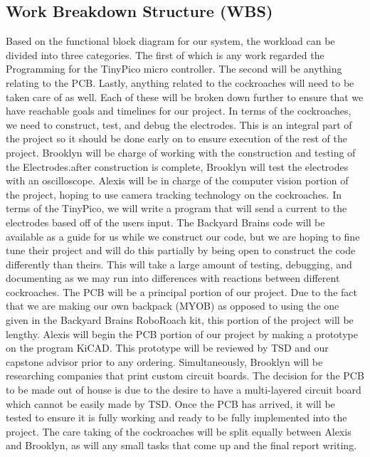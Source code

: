 \documentclass[twocolumn,10pt]{IEEEtran}
\begin{document}
\subsection{Work Breakdown Structure (WBS)}
Based on the functional block diagram for our system, the workload can be divided into three categories. The first of which is any work regarded the Programming for the TinyPico micro controller. The second will be anything relating to the PCB. Lastly, anything related to the cockroaches will need to be taken care of as well. Each of these will be broken down further to ensure that we have reachable goals and timelines for our project. In terms of the cockroaches, we need to construct, test, and debug the electrodes. This is an integral part of the project so it should be done early on to ensure execution of the rest of the project. Brooklyn will be charge of working with the construction and testing of the Electrodes.after construction is complete, Brooklyn will test the electrodes with an oscilloscope. Alexis will be in charge of the computer vision portion of the project, hoping to use camera tracking technology on the cockroaches. In terms of the TinyPico, we will write a program that will send a current to the electrodes based off of the users input. The Backyard Brains code will be available as a guide for us while we construct our code, but we are hoping to fine tune their project and will do this partially by being open to construct the code differently than theirs. This will take a large amount of testing, debugging, and documenting as we may run into differences with reactions between different cockroaches. The PCB will be a principal portion of our project. Due to the fact that we are making our own backpack (MYOB) as opposed to using the one given in the Backyard Brains RoboRoach kit, this portion of the project will be lengthy. Alexis will begin the PCB portion of our project by making a prototype on the program KiCAD. This prototype will be reviewed by TSD and our capstone advisor prior to any ordering. Simultaneously, Brooklyn will be researching companies that print custom circuit boards. The decision for the PCB to be made out of house is due to the desire to have a multi-layered circuit board which cannot be easily made by TSD. Once the PCB has arrived, it will be tested to ensure it is fully working and ready to be fully implemented into the project. The care taking of the cockroaches will be split equally between Alexis and Brooklyn, as will any small tasks that come up and the final report writing.  
\end{document}

